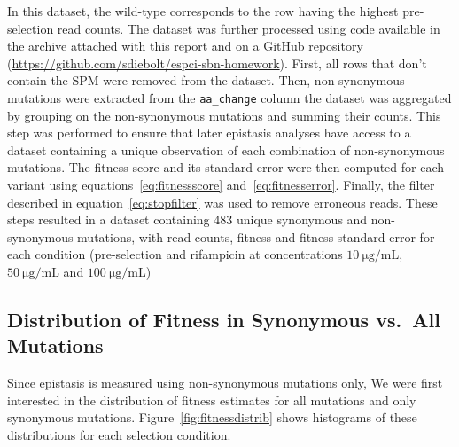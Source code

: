 \documentclass[12pt]{article}
\begin{document}
  In this dataset, the wild-type corresponds to the row having the highest
  pre-selection read counts. The dataset was further processed using code
  available in the archive attached with this report and on a GitHub repository
  (\url{https://github.com/sdiebolt/espci-sbn-homework}). First, all rows that
  don't contain the SPM were removed from the dataset. Then, non-synonymous
  mutations were extracted from the \lstinline{aa_change} column the dataset
  was aggregated by grouping on the non-synonymous mutations and summing their
  counts. This step was performed to ensure that later epistasis analyses have
  access to a dataset containing a unique observation of each combination of
  non-synonymous mutations. The fitness score and its standard error were then
  computed for each variant using equations~\eqref{eq:fitnessscore}
  and~\eqref{eq:fitnesserror}. Finally, the filter described in
  equation~\eqref{eq:stopfilter} was used to remove erroneous reads. These
  steps resulted in a dataset containing 483 unique synonymous and
  non-synonymous mutations, with read counts, fitness and fitness standard
  error for each condition (pre-selection and rifampicin at concentrations
  $\SI{10}{\micro\gram\per\milli\liter}$,
  $\SI{50}{\micro\gram\per\milli\liter}$ and
  $\SI{100}{\micro\gram\per\milli\liter}$)

  \subsection{Distribution of Fitness in Synonymous vs.\ All Mutations}

  Since epistasis is measured using non-synonymous mutations only, We were
  first interested in the distribution of fitness estimates for all mutations
  and only synonymous mutations. Figure~\ref{fig:fitnessdistrib} shows
  histograms of these distributions for each selection condition.
\end{document}
